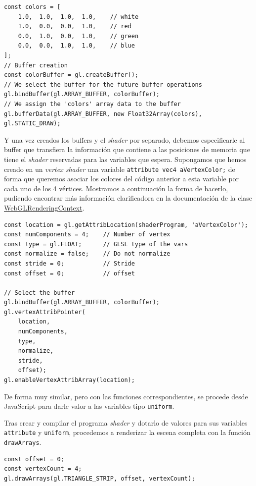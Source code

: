 \begin{lstlisting}
const colors = [
    1.0,  1.0,  1.0,  1.0,    // white
    1.0,  0.0,  0.0,  1.0,    // red
    0.0,  1.0,  0.0,  1.0,    // green
    0.0,  0.0,  1.0,  1.0,    // blue
];
// Buffer creation
const colorBuffer = gl.createBuffer();
// We select the buffer for the future buffer operations
gl.bindBuffer(gl.ARRAY_BUFFER, colorBuffer);
// We assign the 'colors' array data to the buffer
gl.bufferData(gl.ARRAY_BUFFER, new Float32Array(colors), gl.STATIC_DRAW);
\end{lstlisting}

Y una vez creados los buffers y el \textit{shader} por separado, debemos especificarle al buffer que transfiera la información que contiene a las posiciones de memoria que tiene el \textit{shader} reservadas para las variables que espera. Supongamos que hemos creado en un \textit{vertex shader} una variable \verb|attribute vec4 aVertexColor;| de forma que queremos asociar los colores del código anterior a esta variable por cada uno de los 4 vértices. Mostramos a continuación la forma de hacerlo, pudiendo encontrar más información clarificadora en la documentación de la clase \href{https://developer.mozilla.org/en-US/docs/Web/API/WebGLRenderingContext}{WebGLRenderingContext}.

\begin{lstlisting}
const location = gl.getAttribLocation(shaderProgram, 'aVertexColor');
const numComponents = 4;    // Number of vertex
const type = gl.FLOAT;      // GLSL type of the vars
const normalize = false;    // Do not normalize
const stride = 0;           // Stride
const offset = 0;           // offset

// Select the buffer
gl.bindBuffer(gl.ARRAY_BUFFER, colorBuffer);
gl.vertexAttribPointer(
    location,
    numComponents,
    type,
    normalize,
    stride,
    offset);
gl.enableVertexAttribArray(location);
\end{lstlisting}

De forma muy similar, pero con las funciones correspondientes, se procede desde JavaScript para darle valor a las variables tipo \verb|uniform|.

Tras crear y compilar el programa \textit{shader} y dotarlo de valores para sus variables \verb|attribute| y \verb|uniform|, procedemos a renderizar la escena completa con la función \verb|drawArrays|.

\begin{lstlisting}
const offset = 0;
const vertexCount = 4;
gl.drawArrays(gl.TRIANGLE_STRIP, offset, vertexCount);
\end{lstlisting}

